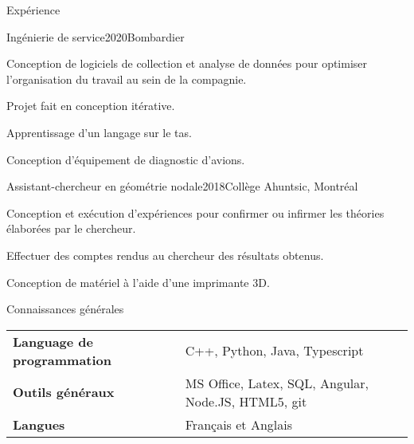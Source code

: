\documentclass[french,12pt]{resume} %
\begin{document}
	\begin{rSection}{Expérience}
		
		\begin{rSubsection}{Ingénierie de service}{2020}{Bombardier}{}{}
			\item Conception de logiciels de collection et analyse de données pour optimiser l'organisation du travail au sein de la compagnie.
			\item Projet fait en conception itérative. 
			\item Apprentissage d'un langage sur le tas.
			\item Conception d'équipement de diagnostic d'avions.
		\end{rSubsection}
		
		\begin{rSubsection}{Assistant-chercheur en géométrie nodale}{2018}{Collège Ahuntsic, Montréal}{}
			\item 	Conception et exécution d'expériences pour confirmer ou infirmer les théories élaborées par le chercheur.
			\item   Effectuer des comptes rendus au chercheur des résultats obtenus.
			\item   Conception de matériel à l’aide d’une imprimante 3D.
		\end{rSubsection}
		
		
	\end{rSection}
	
	

	
	\begin{rSection}{Connaissances générales}
		
		\begin{tabular}{ @{} >{\bfseries}l @{\hspace{6ex}} l }
			Language de programmation \              & C++, Python, Java, Typescript \\
			Outils généraux                 & MS Office, Latex, SQL, Angular, Node.JS, HTML5, git \\
			Langues & Français et Anglais
		\end{tabular}
		
	\end{rSection}
	
	
\end{document}
